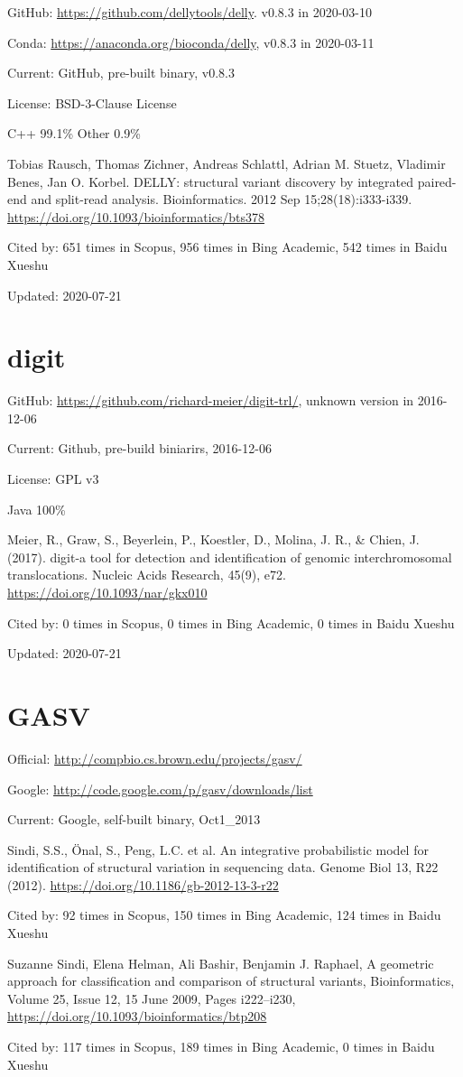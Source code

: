 \documentclass[]{article}
\newcommand{\cb}[3]{\par Cited by: {\color{blue}\Huge #1} times in Scopus, {\color{blue}\Huge #2} times in Bing Academic, {\color{blue}\Huge #3} times in Baidu Xueshu}
\begin{document}
GitHub: \url{https://github.com/dellytools/delly}. v0.8.3 in 2020-03-10

Conda: \url{https://anaconda.org/bioconda/delly}, v0.8.3 in 2020-03-11

Current: GitHub, pre-built binary, v0.8.3

License:  BSD-3-Clause License 

C++ 99.1\% Other 0.9\%

Tobias Rausch, Thomas Zichner, Andreas Schlattl, Adrian M. Stuetz, Vladimir Benes, Jan O. Korbel. DELLY: structural variant discovery by integrated paired-end and split-read analysis. Bioinformatics. 2012 Sep 15;28(18):i333-i339. \url{https://doi.org/10.1093/bioinformatics/bts378}\cb{651}{956}{542}

Updated: 2020-07-21

\section{digit}

GitHub: \url{https://github.com/richard-meier/digit-trl/}, unknown version in 2016-12-06

Current: Github, pre-build biniarirs, 2016-12-06

License: GPL v3

Java 100\%

Meier, R., Graw, S., Beyerlein, P., Koestler, D., Molina, J. R., \& Chien, J. (2017). digit-a tool for detection and identification of genomic interchromosomal translocations. Nucleic Acids Research, 45(9), e72. \url{https://doi.org/10.1093/nar/gkx010}\cb{0}{0}{0}

Updated: 2020-07-21

\section{GASV}

Official: \url{http://compbio.cs.brown.edu/projects/gasv/}

Google: \url{http://code.google.com/p/gasv/downloads/list}

Current: Google, self-built binary, Oct1\_2013

Sindi, S.S., Önal, S., Peng, L.C. et al. An integrative probabilistic model for identification of structural variation in sequencing data. Genome Biol 13, R22 (2012). \url{https://doi.org/10.1186/gb-2012-13-3-r22}\cb{92}{150}{124}

Suzanne Sindi, Elena Helman, Ali Bashir, Benjamin J. Raphael, A geometric approach for classification and comparison of structural variants, Bioinformatics, Volume 25, Issue 12, 15 June 2009, Pages i222–i230, \url{https://doi.org/10.1093/bioinformatics/btp208}\cb{117}{189}{0}
\end{document}
